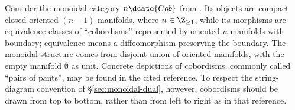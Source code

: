 \begin{example}[Cobordisms]
	Consider the monoidal category $n\dcate{Cob}$ from
	\cite[Example 3.1.4]{Li1}. Its objects are compact closed oriented
	$(n-1)$-manifolds, where $n\in\Z_{\geq1}$, while its morphisms are
	equivalence classes of ``cobordisms'' represented by oriented
	$n$-manifolds with boundary; equivalence means a diffeomorphism preserving
	the boundary. The monoidal structure comes from disjoint union of oriented
	manifolds, with the empty manifold $\emptyset$ as unit. Concrete depictions
	of cobordisms, commonly called ``pairs of pants'', may be found in the
	cited reference. To respect the string-diagram convention of
	\S\ref{sec:monoidal-dual}, however, cobordisms should be drawn from top to
	bottom, rather than from left to right as in that reference.


\end{example}
